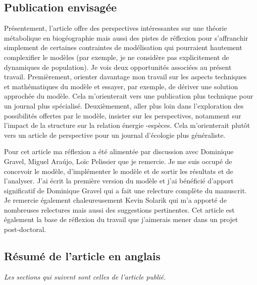 \subsection{Publication envisagée}

Présentement, l'article offre des perspectives intéressantes sur une
théorie métabolique en biogéographie mais aussi des pistes de réflexion
 pour s'affranchir simplement de certaines contraintes de modélisation
qui pourraient hautement  complexifier le modèles (par exemple,  je ne considère
pas explicitement de dynamiques de population). Je vois deux opportunités
associées au présent travail. Premièrement, orienter davantage mon travail
sur les aspects techniques et mathématiques du modèle et essayer,
par exemple, de dériver une solution approchée du modèle.
Cela m'orienterait vers une publication plus technique
pour un journal plus spécialisé. Deuxièmement, aller plus loin dans l'exploration
des possibilités offertes par le modèle, insister sur les perspectives, notamment
sur l'impact de la structure sur la relation énergie -espèces. Cela m'orienterait plutôt vers
un article de perspective pour un journal d’écologie plus généraliste.


Pour cet article ma réflexion a été alimentée par discussion avec Dominique Gravel,
Miguel Araújo, Loïc Pelissier que je remercie. Je me suis occupé de concevoir le modèle,
d'implémenter le modèle et de sortir les résultats et de l'analyser.
J'ai écrit la première version du modèle et j'ai bénéficié d'apport significatif
de Dominique Gravel qui a fait une relecture complète du manuscrit. Je remercie
également chaleureusement Kevin Solarik qui m'a apporté de nombreuses
relectures mais aussi des suggestions pertinentes.
Cet article est également la base de réflexion du travail que
j’aimerais mener dans un projet post-doctoral.


\subsection{Résumé de l'article en anglais}



\emph{Les sections qui suivent sont celles de l'article publié.}
